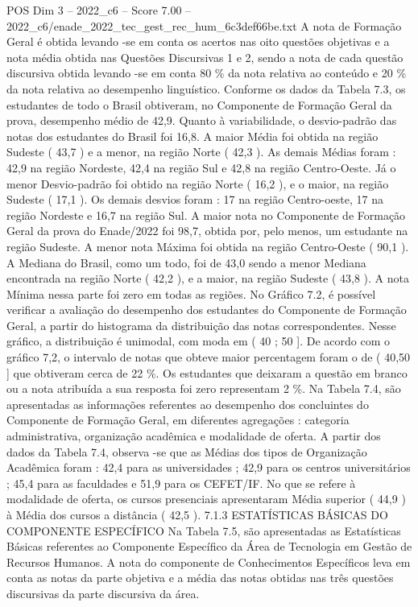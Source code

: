 \begin{textsample}{POS Dim 3 – 2022\_c6 – Score 7.00 – 2022\_c6/enade\_2022\_tec\_gest\_rec\_hum\_6c3def66be.txt}
A nota de Formação Geral é obtida levando -se em conta os acertos nas oito questões objetivas e a nota média obtida nas Questões Discursivas 1 e 2, sendo a nota de cada questão discursiva obtida levando -se em conta 80 \% da nota relativa ao conteúdo e 20 \% da nota relativa ao desempenho linguístico.
Conforme os dados da Tabela 7.3, os estudantes de todo o Brasil obtiveram, no Componente de Formação Geral da prova, desempenho médio de 42,9.
Quanto à variabilidade, o desvio-padrão das notas dos estudantes do Brasil foi 16,8.
A maior Média foi obtida na região Sudeste ( 43,7 ) e a menor, na região Norte ( 42,3 ).
As demais Médias foram : 42,9 na região Nordeste, 42,4 na região Sul e 42,8 na região Centro-Oeste.
Já o menor Desvio-padrão foi obtido na região Norte ( 16,2 ), e o maior, na região Sudeste ( 17,1 ).
Os demais desvios foram : 17 na região Centro-oeste, 17 na região Nordeste e 16,7 na região Sul.
A maior nota no Componente de Formação Geral da prova do Enade/2022 foi 98,7, obtida por, pelo menos, um estudante na região Sudeste.
A menor nota Máxima foi obtida na região Centro-Oeste ( 90,1 ).
A Mediana do Brasil, como um todo, foi de 43,0 sendo a menor Mediana encontrada na região Norte ( 42,2 ), e a maior, na região Sudeste ( 43,8 ).
A nota Mínima nessa parte foi zero em todas as regiões.
No Gráfico 7.2, é possível verificar a avaliação do desempenho dos estudantes do Componente de Formação Geral, a partir do histograma da distribuição das notas correspondentes.
Nesse gráfico, a distribuição é unimodal, com moda em ( 40 ; 50 ].
De acordo com o gráfico 7,2, o intervalo de notas que obteve maior percentagem foram o de ( 40,50 ] que obtiveram cerca de 22 \%.
Os estudantes que deixaram a questão em branco ou a nota atribuída a sua resposta foi zero representam 2 \%.
Na Tabela 7.4, são apresentadas as informações referentes ao desempenho dos concluintes do Componente de Formação Geral, em diferentes agregações : categoria administrativa, organização acadêmica e modalidade de oferta.
A partir dos dados da Tabela 7.4, observa -se que as Médias dos tipos de Organização Acadêmica foram : 42,4 para as universidades ; 42,9 para os centros universitários ; 45,4 para as faculdades e 51,9 para os CEFET/IF.
No que se refere à modalidade de oferta, os cursos presenciais apresentaram Média superior ( 44,9 ) à Média dos cursos a distância ( 42,5 ). 7.1.3 ESTATÍSTICAS BÁSICAS DO COMPONENTE ESPECÍFICO Na Tabela 7.5, são apresentadas as Estatísticas Básicas referentes ao Componente Específico da Área de Tecnologia em Gestão de Recursos Humanos.
A nota do componente de Conhecimentos Específicos leva em conta as notas da parte objetiva e a média das notas obtidas nas três questões discursivas da parte discursiva da área.

\end{textsample}
